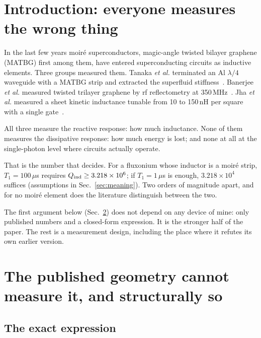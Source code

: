 \documentclass[aps,prb,reprint,superscriptaddress,longbibliography]{revtex4-2}
\begin{document}
\section{Introduction: everyone measures the wrong thing}

In the last few years moir\'e superconductors, magic-angle twisted
bilayer graphene (MATBG) first among them, have entered superconducting
circuits as inductive elements. Three groups measured them. Tanaka
\emph{et al.} terminated an Al $\lambda/4$ waveguide with a MATBG strip
and extracted the superfluid stiffness~\cite{Tanaka2025}. Banerjee
\emph{et al.} measured twisted trilayer graphene by rf reflectometry at
350\,MHz~\cite{Banerjee2025}. Jha \emph{et al.} measured a sheet kinetic
inductance tunable from 10 to 150\,nH per square with a single
gate~\cite{Jha2025}.

All three measure the reactive response: how much inductance. None of
them measures the dissipative response: how much energy is lost; and
none at all at the single-photon level where circuits actually operate.

That is the number that decides. For a fluxonium whose inductor is a
moir\'e strip, $T_1 = 100\,\mu$s requires $Q_{\rm ind} \geq 3.218 \times
10^{6}$; if $T_1 = 1\,\mu$s is enough, $3.218 \times 10^{4}$ suffices
(assumptions in Sec.~\ref{sec:meaning}). Two orders of magnitude apart,
and for no moir\'e element does the literature distinguish between the
two.

The first argument below (Sec.~\ref{sec:geometry}) does not depend on
any device of mine: only published numbers and a closed-form expression.
It is the stronger half of the paper. The rest is a measurement design,
including the place where it refutes its own earlier version.

\section{The published geometry cannot measure it, and structurally so}
\label{sec:geometry}

\subsection{The exact expression}
\end{document}
